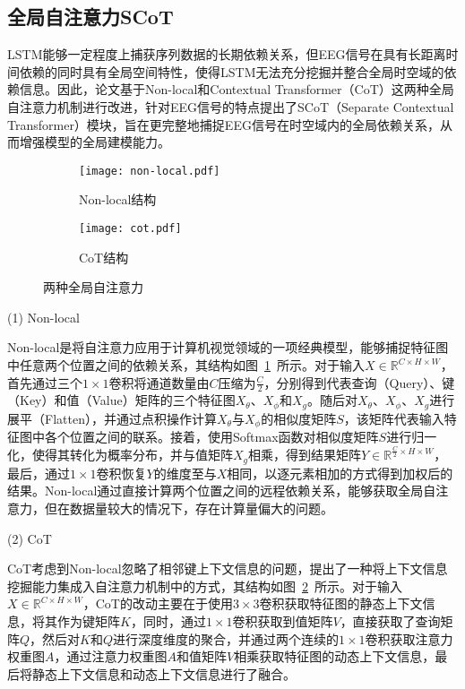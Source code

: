 \subsection{全局自注意力SCoT}

LSTM能够一定程度上捕获序列数据的长期依赖关系，但EEG信号在具有长距离时间依赖的同时具有全局空间特性，使得LSTM无法充分挖掘并整合全局时空域的依赖信息。因此，论文基于Non-local\cite{wang2018non}和Contextual Transformer（CoT）\cite{li2022contextual}这两种全局自注意力机制进行改进，针对EEG信号的特点提出了SCoT（Separate Contextual Transformer）模块，旨在更完整地捕捉EEG信号在时空域内的全局依赖关系，从而增强模型的全局建模能力。
\begin{figure}[h]
    \centering
    \begin{subfigure}{0.4\textwidth}
      \texttt{[image: non-local.pdf]}
      \caption{Non-local结构\cite{wang2018non}}
      \label{fig:non-local}
    \end{subfigure}\qquad
    \begin{subfigure}{0.4\textwidth}
      \texttt{[image: cot.pdf]}
      \caption{CoT结构\cite{li2022contextual}}
      \label{fig:cot}
    \end{subfigure}
    \caption{两种全局自注意力}
    \label{fig:self}
\end{figure}

(1) Non-local

Non-local是将自注意力\cite{vaswani2017attention}应用于计算机视觉领域的一项经典模型，能够捕捉特征图中任意两个位置之间的依赖关系，其结构如图~\ref{fig:non-local}~所示。对于输入\(X \in \mathbb{R}^{C \times H \times W}\)，首先通过三个\(1\times1\)卷积将通道数量由\(C\)压缩为\(\frac{C}{2}\)，分别得到代表查询（Query）、键（Key）和值（Value）矩阵的三个特征图\(X_\theta\)、\(X_\phi\)和\(X_g\)。随后对\(X_\theta\)、\(X_\phi\)、\(X_g\)进行展平（Flatten），并通过点积操作计算\(X_\theta\)与\(X_\phi\)的相似度矩阵\(S\)，该矩阵代表输入特征图中各个位置之间的联系。接着，使用Softmax函数对相似度矩阵\(S\)进行归一化，使得其转化为概率分布，并与值矩阵\(X_g\)相乘，得到结果矩阵\(Y \in \mathbb{R}^{\frac{C}{2} \times H \times W}\)，最后，通过\(1\times1\)卷积恢复\(Y\)的维度至与\(X\)相同，以逐元素相加的方式得到加权后的结果。Non-local通过直接计算两个位置之间的远程依赖关系，能够获取全局自注意力，但在数据量较大的情况下，存在计算量偏大的问题。

(2) CoT

CoT考虑到Non-local忽略了相邻键上下文信息的问题，提出了一种将上下文信息挖掘能力集成入自注意力机制中的方式，其结构如图~\ref{fig:cot}~所示。对于输入\(X \in \mathbb{R}^{C \times H \times W}\)，CoT的改动主要在于使用\(3\times3\)卷积获取特征图的静态上下文信息，将其作为键矩阵\(K\)，同时，通过\(1\times1\)卷积获取到值矩阵\(V\)，直接获取了查询矩阵\(Q\)，然后对\(K\)和\(Q\)进行深度维度的聚合，并通过两个连续的\(1\times1\)卷积获取注意力权重图\(A\)，通过注意力权重图\(A\)和值矩阵\(V\)相乘获取特征图的动态上下文信息，最后将静态上下文信息和动态上下文信息进行了融合。

